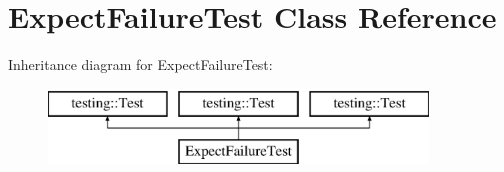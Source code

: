 \hypertarget{class_expect_failure_test}{}\section{Expect\+Failure\+Test Class Reference}
\label{class_expect_failure_test}
Inheritance diagram for Expect\+Failure\+Test\+:\begin{figure}[H]
\begin{center}
\leavevmode
\includegraphics[height=2.000000cm]{d0/dc9/class_expect_failure_test}
\end{center}
\end{figure}
